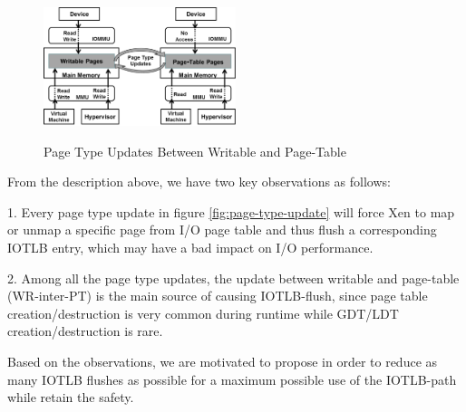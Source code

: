 \begin{figure}[ht]
\centering
\includegraphics[width=0.5\textwidth]{image/background/wr2pt.png} \\
\caption{Page Type Updates Between Writable and Page-Table}
\label{fig:wr2pt}
\end{figure}

From the description above, we have two key observations as follows:

1. Every page type update in figure \ref{fig:page-type-update} will force Xen to map or unmap a specific page from I/O page table and thus flush a corresponding IOTLB entry, which may have a bad impact on I/O performance.

2. Among all the page type updates, the update between writable and page-table (WR-inter-PT) is the main source of causing IOTLB-flush, since page table creation/destruction is very common during runtime while GDT/LDT creation/destruction is rare.

Based on the observations, we are motivated to propose \name in order to reduce as many IOTLB flushes as possible for a maximum possible use of the IOTLB-path while retain the safety.
